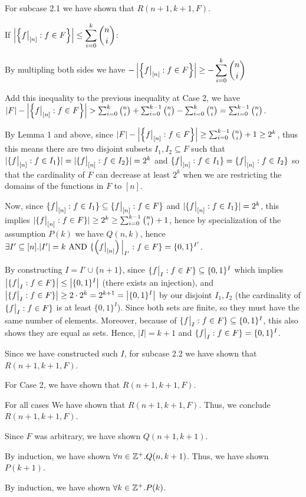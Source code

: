 \documentclass[11pt, brown, sepia, 1in]{hw}
\begin{document}
{{{{{{\begin{proofcases}
{                                For subcase 2.1 we have shown that $R(n+1,k+1,F)$.

                                \subcase If $\abs{\curbra{\restr{f}{[n]}:f\in F}}\leq\ds\sum_{i=0}^k\binom{n}{i}$:

                                By multipling both sides we have $-\abs{\curbra{\restr{f}{[n]}:f\in F}}\geq-\ds\sum_{i=0}^k\binom{n}{i}$

                                Add this inequality to the previous inequality at Case 2, we have $|F|-\abs{\curbra{\restr{f}{[n]}:f\in F}}>\sum_{i=0}^k\binom{n}{i}+\sum_{i=0}^{k-1}\binom{n}{i}-\sum_{i=0}^k\binom{n}{i}=\sum_{i=0}^{k-1}\binom{n}{i}$.

                                By Lemma 1 and above, since $|F|-\abs{\curbra{\restr{f}{[n]}:f\in F}}\geq\sum_{i=0}^{k-1}\binom{n}{i}+1\geq 2^k$, thus this means there are two disjoint subsets $I_1,I_2\subseteq F$ such that $|\{\restr{f}{[n]}: f\in I_1\}|=|\{\restr{f}{[n]}: f\in I_2\}|=2^k$ and $\{\restr{f}{[n]}: f\in I_1\}=\{\restr{f}{[n]}: f\in I_2\}$ so that the cardinality of $F$ can decrease at least $2^k$ when we are restricting the domains of the functions in $F$ to $[n]$.

                                Now, since $\{\restr{f}{[n]}:f\in I_1\}\subseteq \{\restr{f}{[n]}:f\in F\}$ and $|\{\restr{f}{[n]}: f\in I_1\}|=2^k$, this implies $|\{\restr{f}{[n]}:f\in F\}|\geq 2^k\geq\sum_{i=0}^{k-1}\binom{n}{i}+1$, hence by specialization of the assumption $P(k)$ we have $Q(n,k)$, hence $\exists I'\subseteq[n].|I'|=k\aand\{\restr{\bra{\restr{f}{[n]}}}{I'}: f\in F\}=\{0,1\}^{I'}$. 

                                By constructing $I=I'\cup\{n+1\}$, since $\{\restr{f}{I}: f\in F\}\subseteq\{0,1\}^{I}$ which implies $\abs{\{\restr{f}{I}: f\in F\}}\leq\abs{\{0,1\}^I}$ (there exists an injection), and $\abs{\{\restr{f}{I}: f\in F\}}\geq 2\cd2^{k}=2^{k+1}=\abs{\{0,1\}^I}$ by our disjoint $I_1,I_2$ (the cardinality of $\{\restr{f}{I}:f\in F\}$ is at least $\{0,1\}^I$). Since both sets are finite, so they must have the same number of elements. Moreover, because of $\{\restr{f}{I}: f\in F\}\subseteq\{0,1\}^{I}$, this also shows they are equal as sets. Hence, $|I|=k+1$ and $\{\restr{f}{I}: f\in F\}=\{0,1\}^{I}$.

                                Since we have constructed such $I$, for subcase 2.2 we have shown that $R(n+1,k+1,F)$.
                            }

                            For Case 2, we have shown that $R(n+1,k+1,F)$.
                        \end{proofcases}

                        For all cases We have shown that $R(n+1,k+1,F)$. Thus, we conclude $R(n+1,k+1,F)$.
                    }

                    Since $F$ was arbitrary, we have shown $Q(n+1,k+1)$.
                }
            }

            By induction, we have shown $\forall n\in\mathbb{Z}^+. Q(n,k+1)$. Thus, we have shown $P(k+1)$.
        }
    }

    By induction, we have shown $\forall k\in\mathbb{Z}^+. P(k)$.
}
\end{document}
